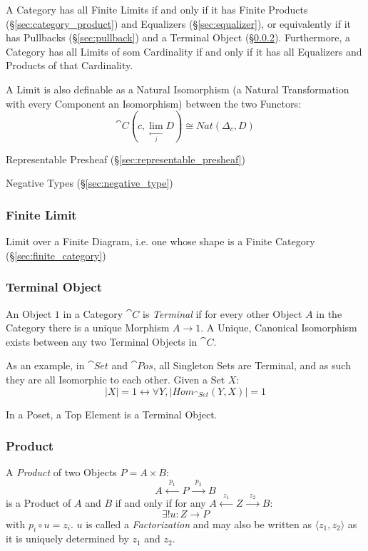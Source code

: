 A Category has all Finite Limits if and only if it has Finite Products
(\S\ref{sec:category_product}) and Equalizers (\S\ref{sec:equalizer}),
or equivalently if it has Pullbacks (\S\ref{sec:pullback}) and a
Terminal Object (\S\ref{sec:terminal_object}). Furthermore, a Category
has all Limits of som Cardinality if and only if it has all Equalizers
and Products of that Cardinality. \cite{awodey06}

A Limit is also definable as a Natural Isomorphism (a Natural
Transformation with every Component an Isomorphism) between the two
Functors:
\[
  \cat{C}(c, \lim_{\xleftarrow[j]{}} D) \cong Nat (\Delta_c, D)
\]

Representable Presheaf (\S\ref{sec:representable_presheaf})

Negative Types (\S\ref{sec:negative_type})



\subsubsection{Finite Limit}\label{sec:finite_limit}

Limit over a Finite Diagram, i.e. one whose shape is a Finite Category
(\S\ref{sec:finite_category})



\subsubsection{Terminal Object}\label{sec:terminal_object}

An Object $1$ in a Category $\cat{C}$ is \emph{Terminal} if for
every other Object $A$ in the Category there is a unique Morphism $A
\rightarrow 1$. A Unique, Canonical Isomorphism exists between any two
Terminal Objects in $\cat{C}$.

As an example, in $\cat{Set}$ and $\cat{Pos}$, all Singleton
Sets are Terminal, and as such they are all Isomorphic to each other.
Given a Set $X$:
\[
  |X| = 1 \leftrightarrow \forall Y, |Hom_{\cat{Set}}(Y,X)| = 1
\]

In a Poset, a Top Element is a Terminal Object.



\subsubsection{Product}\label{sec:product}

A \emph{Product} of two Objects $P = A \times B$:
\[
  A \xleftarrow{\;\;p_1\;\;} P \xrightarrow{\;\;p_2\;\;} B
\]
is a Product of $A$ and $B$ if and only if for any $A
\xleftarrow{\;\;z_1\;\;} Z \xrightarrow{\;\;z_2\;\;} B$:
\[
  \exists!u : Z \rightarrow P
\]
with $p_i \circ u = z_i$. $u$ is called a \emph{Factorization} and may
also be written as $\langle z_1, z_2 \rangle$ as it is uniquely
determined by $z_1$ and $z_2$.

